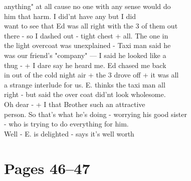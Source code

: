 \documentclass[11pt,a4paper]{article}
\begin{document}
{anything" at all cause no one with any sense would do \\
him that harm. I did'nt have any  but I did \\
want to see that Ed was all right with the 3 of them out \\
there - so I dashed out - tight chest + all. The one in \\
the light overcoat was unexplained - Taxi man said he \\
was our friend's "company" --- I said he looked like a \\
thug - + I dare say he heard me. Ed chased me back \\
in out of the cold night air + the 3 drove off + it was all \\
a strange interlude for us. E. thinks the taxi man all \\
right - but said the  over coat did'nt look wholesome. \\
\quad Oh dear - + I  that Brother such an attractive \\
person. So that's what he's doing - worrying his good sister \\
- who is trying to do everything for him. \\
\quad Well - E. is delighted - says it's well worth}




\section{Pages 46--47}


\end{document}
